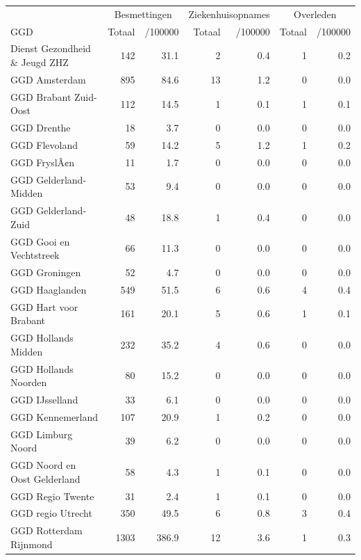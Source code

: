 \documentclass[
  english,
  man,floatsintext]{apa6}
\begin{document}
\begin{table}[H]
\centering\begingroup\fontsize{10}{12}\selectfont

\begin{threeparttable}
\begin{tabular}{lrrrrrr}
\toprule
\multicolumn{1}{c}{ } & \multicolumn{2}{c}{Besmettingen} & \multicolumn{2}{c}{Ziekenhuisopnames} & \multicolumn{2}{c}{Overleden} \\
\cmidrule(l{3pt}r{3pt}){2-3} \cmidrule(l{3pt}r{3pt}){4-5} \cmidrule(l{3pt}r{3pt}){6-7}
GGD & Totaal & /100000 & Totaal & /100000 & Totaal & /100000\\
\midrule
Dienst Gezondheid \& Jeugd ZHZ & 142 & 31.1 & 2 & 0.4 & 1 & 0.2\\
GGD Amsterdam & 895 & 84.6 & 13 & 1.2 & 0 & 0.0\\
GGD Brabant Zuid-Oost & 112 & 14.5 & 1 & 0.1 & 1 & 0.1\\
GGD Drenthe & 18 & 3.7 & 0 & 0.0 & 0 & 0.0\\
GGD Flevoland & 59 & 14.2 & 5 & 1.2 & 1 & 0.2\\
GGD FryslÃ¢n & 11 & 1.7 & 0 & 0.0 & 0 & 0.0\\
GGD Gelderland-Midden & 53 & 9.4 & 0 & 0.0 & 0 & 0.0\\
GGD Gelderland-Zuid & 48 & 18.8 & 1 & 0.4 & 0 & 0.0\\
GGD Gooi en Vechtstreek & 66 & 11.3 & 0 & 0.0 & 0 & 0.0\\
GGD Groningen & 52 & 4.7 & 0 & 0.0 & 0 & 0.0\\
GGD Haaglanden & 549 & 51.5 & 6 & 0.6 & 4 & 0.4\\
GGD Hart voor Brabant & 161 & 20.1 & 5 & 0.6 & 1 & 0.1\\
GGD Hollands Midden & 232 & 35.2 & 4 & 0.6 & 0 & 0.0\\
GGD Hollands Noorden & 80 & 15.2 & 0 & 0.0 & 0 & 0.0\\
GGD IJsselland & 33 & 6.1 & 0 & 0.0 & 0 & 0.0\\
GGD Kennemerland & 107 & 20.9 & 1 & 0.2 & 0 & 0.0\\
GGD Limburg Noord & 39 & 6.2 & 0 & 0.0 & 0 & 0.0\\
GGD Noord en Oost Gelderland & 58 & 4.3 & 1 & 0.1 & 0 & 0.0\\
GGD Regio Twente & 31 & 2.4 & 1 & 0.1 & 0 & 0.0\\
GGD regio Utrecht & 350 & 49.5 & 6 & 0.8 & 3 & 0.4\\
GGD Rotterdam Rijnmond & 1303 & 386.9 & 12 & 3.6 & 1 & 0.3\\

\end{tabular}
\end{threeparttable}
\end{table}
\end{document}
